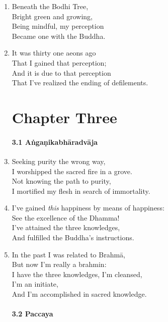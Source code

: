 \documentclass[10pt, openany]{book}
\begin{document}
\begin{enumerate}
\item Beneath the Bodhi Tree,\\
Bright green and growing,\\
Being mindful, my perception\\
Became one with the Buddha.

\item It was thirty one aeons ago\\
That I gained that perception;\\
And it is due to that perception\\
That I’ve realized the ending of defilements.

\chapter*{Chapter Three}

\subsubsection*{3.1 Aṅgaṇikabhāradvāja}

\item Seeking purity the wrong way,\\
I worshipped the sacred fire in a grove.\\
Not knowing the path to purity,\\
I mortified my flesh in search of immortality.

\item I’ve gained \emph{this} happiness by means of happiness:\\
See the excellence of the Dhamma!\\
I’ve attained the three knowledges,\\
And fulfilled the Buddha’s instructions.

\item In the past I was related to Brahmā,\\
But now I’m really a brahmin:\\
I have the three knowledges, I’m cleansed,\\
I’m an initiate, \\
And I’m accomplished in sacred knowledge.

\subsubsection*{3.2 Paccaya}


\end{enumerate}
\end{document}
